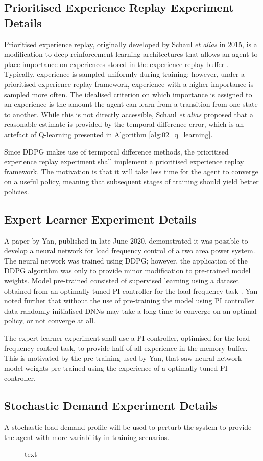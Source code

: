 \subsection{Prioritised Experience Replay Experiment Details}
Prioritised experience replay, originally developed by Schaul \textit{et alias} in 2015, is a modification to deep reinforcement learning architectures that allows an agent to place importance on experiences stored in the experience replay buffer \cite{Schaul2015}. Typically, experience is sampled uniformly during training; however, under a prioritised experience replay framework, experience with a higher importance is sampled more often. The idealised criterion on which importance is assigned to an experience is the amount the agent can learn from a transition from one state to another. While this is not directly accessible, Schaul \textit{et alias} proposed that a reasonable estimate is provided by the temporal difference error, which is an artefact of Q-learning presented in Algorithm \ref{alg:02_q_learning}.

Since DDPG makes use of termporal difference methods, the prioritised experience replay experiment shall implement a prioritised experience replay framework. The motivation is that it will take less time for the agent to converge on a useful policy, meaning that subsequent stages of training should yield better policies.

\subsection{Expert Learner Experiment Details}
A paper by Yan, published in late June 2020, demonstrated it was possible to develop a neural network for load frequency control of a two area power system. The neural network was trained using DDPG; however, the application of the DDPG algorithm was only to provide minor modification to pre-trained model weights. Model pre-trained consisted of supervised learning using a dataset obtained from an optimally tuned PI controller for the load frequency task \cite{Yan2020}. Yan noted further that without the use of pre-training the model using PI controller data randomly initialised DNNs may take a long time to converge on an optimal policy, or not converge at all.

The expert learner experiment shall use a PI controller, optimised for the load frequency control task, to provide half of all experience in the memory buffer. This is motivated by the pre-training used by Yan, that saw neural network model weights pre-trained using the experience of a optimally tuned PI controller.

\subsection{Stochastic Demand Experiment Details}\label{sec:stochastic}
A stochastic load demand profile will be used to perturb the system to provide the agent with more variability in training scenarios.

\begin{figure}[h]
	\centering
	
	\caption{text}
\end{figure}

